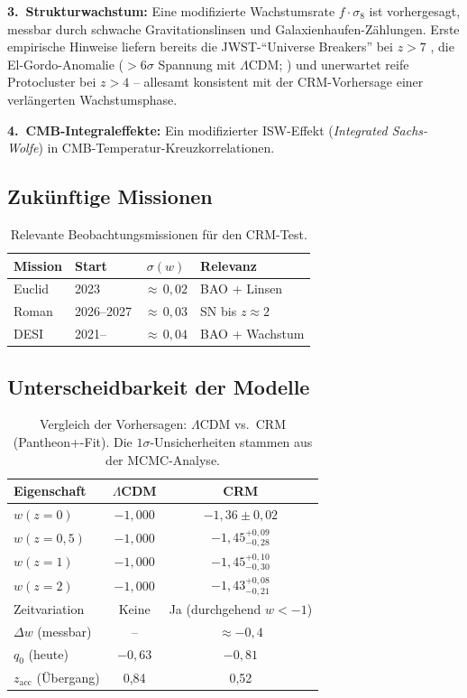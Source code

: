 \documentclass[aps,prd,twocolumn,superscriptaddress,nofootinbib]{revtex4-2}
\begin{document}
\textbf{3.~Strukturwachstum:} Eine modifizierte Wachstumsrate $f \cdot \sigma_8$ ist vorhergesagt, messbar durch schwache Gravitationslinsen und Galaxienhaufen-Zählungen. Erste empirische Hinweise liefern bereits die JWST-``Universe Breakers'' bei $z > 7$ \cite{Labbe2023}, die El-Gordo-Anomalie ($> 6\sigma$ Spannung mit $\Lambda$CDM; \cite{Asencio2023}) und unerwartet reife Protocluster bei $z > 4$ \cite{Miller2018} -- allesamt konsistent mit der CRM-Vorhersage einer verlängerten Wachstumsphase.

\textbf{4.~CMB-Integraleffekte:} Ein modifizierter ISW-Effekt (\textit{Integrated Sachs-Wolfe}) in CMB-Temperatur-Kreuzkorrelationen.

\subsection{Zukünftige Missionen}

\begin{table}[H]
\centering
\caption{Relevante Beobachtungsmissionen für den CRM-Test.}
\label{tab:missions}
\small
\begin{tabular}{llcl}
\toprule
\textbf{Mission} & \textbf{Start} & $\sigma(w)$ & \textbf{Relevanz} \\
\midrule
Euclid & 2023 & ${\approx}\,0{,}02$ & BAO + Linsen \\
Roman & 2026--2027 & ${\approx}\,0{,}03$ & SN bis $z \approx 2$ \\
DESI & 2021-- & ${\approx}\,0{,}04$ & BAO + Wachstum \\
\bottomrule
\end{tabular}
\end{table}

\subsection{Unterscheidbarkeit der Modelle}

\begin{table}[H]
\centering
\caption{Vergleich der Vorhersagen: $\Lambda$CDM vs.\ CRM (Pantheon+-Fit). Die $1\sigma$-Unsicherheiten stammen aus der MCMC-Analyse.}
\label{tab:predictions}
\begin{tabular}{lcc}
\toprule
\textbf{Eigenschaft} & $\Lambda$CDM & CRM \\
\midrule
$w(z{=}0)$ & $-1{,}000$ & $-1{,}36 \pm 0{,}02$ \\
$w(z{=}0{,}5)$ & $-1{,}000$ & $-1{,}45^{+0{,}09}_{-0{,}28}$ \\
$w(z{=}1)$ & $-1{,}000$ & $-1{,}45^{+0{,}10}_{-0{,}30}$ \\
$w(z{=}2)$ & $-1{,}000$ & $-1{,}43^{+0{,}08}_{-0{,}21}$ \\
Zeitvariation & Keine & Ja (durchgehend $w < -1$) \\
$\Delta w$ (messbar) & -- & $\approx -0{,}4$ \\
$q_0$ (heute) & $-0{,}63$ & $-0{,}81$ \\
$z_{\mathrm{acc}}$ (Übergang) & 0,84 & 0,52 \\
\bottomrule
\end{tabular}
\end{table}
\end{document}
